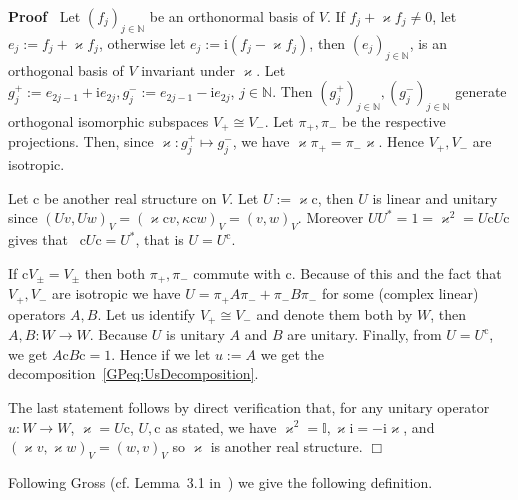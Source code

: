 \documentclass{article}
\newcommand{\assign}{:=}
\newcommand{\mathi}{\mathrm{i}}
\newenvironment{proof}{\noindent\textbf{Proof\ }}{\hspace*{\fill}$\Box$\medskip}
\begin{document}
\begin{proof}
  Let $(f_j)_{j \in \mathbb{N}}$ be an orthonormal basis of $V$. If $f_j +
  \varkappa f_j \neq 0$, let $e_j \assign f_j + \varkappa f_j$, otherwise let
  $e_j \assign \mathi (f_j - \varkappa f_j)$, then $(e_j)_{j \in \mathbb{N}}$,
  is an orthogonal basis of $V$ invariant under $\varkappa$. Let $g^+_j
  \assign e_{2 j - 1} + \mathi e_{2 j}, g^-_j \assign e_{2 j - 1} - \mathi
  e_{2 j}$, $j \in \mathbb{N}$. Then $(g_j^+)_{j \in \mathbb{N}}, (g_j^-)_{j
  \in \mathbb{N}}$ generate orthogonal isomorphic subspaces $V_+ \cong V_-$.
  Let $\pi_+, \pi_-$ be the respective projections. Then, since $\varkappa :
  g^+_j \mapsto g_j^-$, we have $\varkappa \pi_+ = \pi_- \varkappa$. Hence
  $V_+, V_-$ are isotropic.
  
  Let $\mathrm{c}$ be another real structure on $V$. Let $U \assign \varkappa
  \mathrm{c}$, then $U$ is linear and unitary since $(U v, U w)_V = (\varkappa
  \mathrm{c}v, \kappa \mathrm{c}w)_V = (v, w)_V$. Moreover $U U^{\ast} = 1 =
  \varkappa^2 = U\mathrm{c}U\mathrm{c}$ gives that \ $\mathrm{c}U\mathrm{c}=
  U^{\ast}$, that is $U = U^{\mathrm{c}}$.
  
  If $\mathrm{c}V_{\pm} = V_{\pm}$ then both $\pi_+, \pi_-$ commute with
  $\mathrm{c}$. Because of this and the fact that $V_+, V_-$ are isotropic we
  have $U = \pi_+ A \pi_- + \pi_- B \pi_-$ for some (complex linear) operators
  $A, B$. Let us identify $V_+ \cong V_-$ and denote them both by $W$, then
  $A, B : W \rightarrow W$. Because $U$ is unitary $A$ and $B$ are unitary.
  Finally, from $U = U^{\mathrm{c}}$, we get $A\mathrm{c}B\mathrm{c}= 1$.
  Hence if we let $u \assign A$ we get the
  decomposition~{\eqref{GPeq:UsDecomposition}}.
  
  The last statement follows by direct verification that, for any unitary
  operator $u : W \rightarrow W$, $\varkappa = U\mathrm{c}$, $U, \mathrm{c}$
  as stated, we have $\varkappa^2 =\mathbb{I}, \varkappa \mathi = - \mathi
  \varkappa$, and $(\varkappa v, \varkappa w)_V = (w, v)_V$ so $\varkappa$ is
  another real structure.
\end{proof}

Following Gross (cf. Lemma~3.1 in~{\cite{Gross_Euclidean_1976}}) we give the
following definition.
\end{document}
